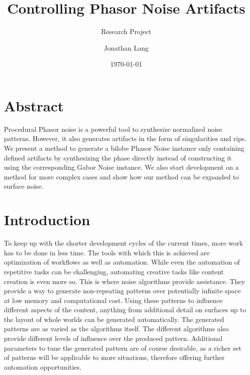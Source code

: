 \documentclass{utue} %
\title{Controlling Phasor Noise Artifacts}
\author{Jonathan Lang}
\date{\today}
\subtitle{Research Project}
\begin{document}

\maketitle 
 
\section*{Abstract}  
Procedural Phasor noise is a powerful tool to synthesize normalized noise patterns. However, it also generates artifacts in the form of singularities and rips. We present a method to generate a bilobe Phasor Noise instance only containing defined artifacts by synthesizing the phase directly instead of constructing it using the corresponding Gabor Noise instance. We also start development on a method for more complex cases and show how our method can be expanded to surface noise.
  
\section{Introduction}   
To keep up with the shorter development cycles of the current times, more work has to be done in less time. The tools with which this is achieved are optimization of workflows as well as automation. While even the automation of repetitive tasks can be challenging, automating creative tasks like content creation is even more so. This is where noise algorithms provide assistance. They provide a way to generate non-repeating patterns over potentially infinite space at low memory and computational cost. Using these patterns to influence different aspects of the content, anything from additional detail on surfaces up to the layout of whole worlds can be generated automatically. The generated patterns are as varied as the algorithms itself. The different algorithms also provide different levels of influence over the produced pattern. Additional parameters to tune the generated pattern are of course desirable, as a richer set of patterns will be applicable to more situations, therefore offering further automation opportunities.
\end{document}
